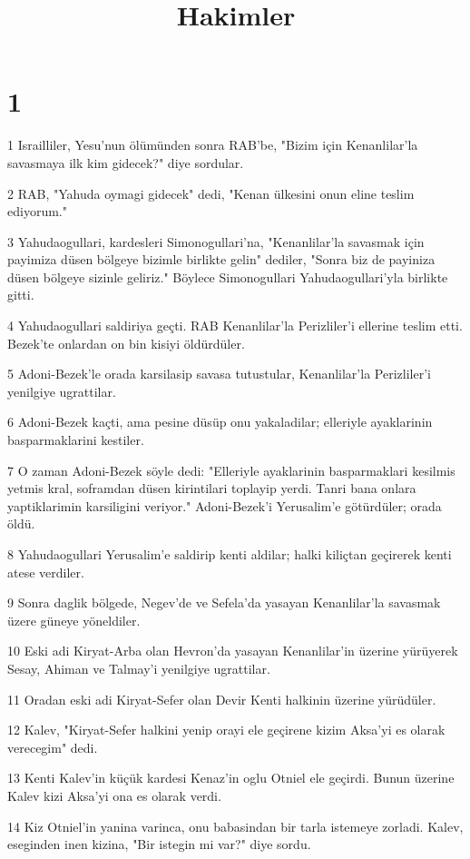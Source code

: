 

\title{Hakimler}


\chapter{1}

\par 1 Israilliler, Yesu'nun ölümünden sonra RAB'be, "Bizim için Kenanlilar'la savasmaya ilk kim gidecek?" diye sordular.
\par 2 RAB, "Yahuda oymagi gidecek" dedi, "Kenan ülkesini onun eline teslim ediyorum."
\par 3 Yahudaogullari, kardesleri Simonogullari'na, "Kenanlilar'la savasmak için payimiza düsen bölgeye bizimle birlikte gelin" dediler, "Sonra biz de payiniza düsen bölgeye sizinle geliriz." Böylece Simonogullari Yahudaogullari'yla birlikte gitti.
\par 4 Yahudaogullari saldiriya geçti. RAB Kenanlilar'la Perizliler'i ellerine teslim etti. Bezek'te onlardan on bin kisiyi öldürdüler.
\par 5 Adoni-Bezek'le orada karsilasip savasa tutustular, Kenanlilar'la Perizliler'i yenilgiye ugrattilar.
\par 6 Adoni-Bezek kaçti, ama pesine düsüp onu yakaladilar; elleriyle ayaklarinin basparmaklarini kestiler.
\par 7 O zaman Adoni-Bezek söyle dedi: "Elleriyle ayaklarinin basparmaklari kesilmis yetmis kral, soframdan düsen kirintilari toplayip yerdi. Tanri bana onlara yaptiklarimin karsiligini veriyor." Adoni-Bezek'i Yerusalim'e götürdüler; orada öldü.
\par 8 Yahudaogullari Yerusalim'e saldirip kenti aldilar; halki kiliçtan geçirerek kenti atese verdiler.
\par 9 Sonra daglik bölgede, Negev'de ve Sefela'da yasayan Kenanlilar'la savasmak üzere güneye yöneldiler.
\par 10 Eski adi Kiryat-Arba olan Hevron'da yasayan Kenanlilar'in üzerine yürüyerek Sesay, Ahiman ve Talmay'i yenilgiye ugrattilar.
\par 11 Oradan eski adi Kiryat-Sefer olan Devir Kenti halkinin üzerine yürüdüler.
\par 12 Kalev, "Kiryat-Sefer halkini yenip orayi ele geçirene kizim Aksa'yi es olarak verecegim" dedi.
\par 13 Kenti Kalev'in küçük kardesi Kenaz'in oglu Otniel ele geçirdi. Bunun üzerine Kalev kizi Aksa'yi ona es olarak verdi.
\par 14 Kiz Otniel'in yanina varinca, onu babasindan bir tarla istemeye zorladi. Kalev, eseginden inen kizina, "Bir istegin mi var?" diye sordu.
